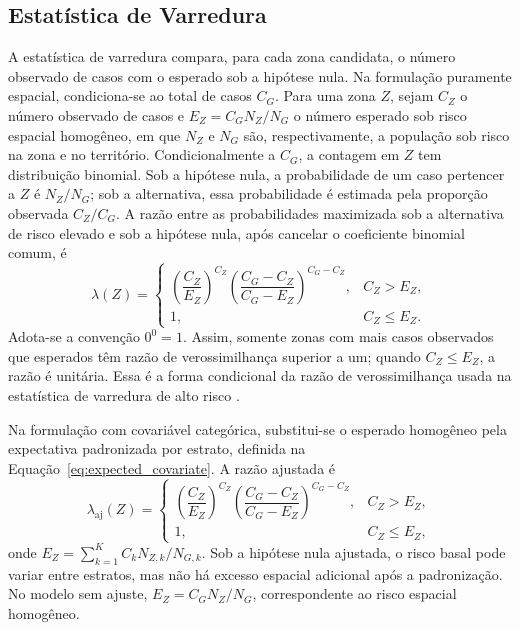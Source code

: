 \subsection{Estatística de Varredura}

A estatística de varredura compara, para cada zona candidata, o número observado de casos com o esperado sob a hipótese nula. Na formulação puramente espacial, condiciona-se ao total de casos \(C_G\). Para uma zona \(Z\), sejam \(C_Z\) o número observado de casos e \(E_Z=C_GN_Z/N_G\) o número esperado sob risco espacial homogêneo, em que \(N_Z\) e \(N_G\) são, respectivamente, a população sob risco na zona e no território. Condicionalmente a \(C_G\), a contagem em \(Z\) tem distribuição binomial. Sob a hipótese nula, a probabilidade de um caso pertencer a \(Z\) é \(N_Z/N_G\); sob a alternativa, essa probabilidade é estimada pela proporção observada \(C_Z/C_G\). A razão entre as probabilidades maximizada sob a alternativa de risco elevado e sob a hipótese nula, após cancelar o coeficiente binomial comum, é
\begin{equation}
\lambda(Z)=
\begin{cases}
\left(\dfrac{C_Z}{E_Z}\right)^{C_Z}
\left(\dfrac{C_G-C_Z}{C_G-E_Z}\right)^{C_G-C_Z}, & C_Z>E_Z,\\[6pt]
1, & C_Z\le E_Z.
\end{cases}
\label{eq:lr_zone}
\end{equation}
Adota-se a convenção \(0^0=1\). Assim, somente zonas com mais casos observados que esperados têm razão de verossimilhança superior a um; quando \(C_Z\le E_Z\), a razão é unitária. Essa é a forma condicional da razão de verossimilhança usada na estatística de varredura de alto risco \cite{kulldorff1997spatial}.

Na formulação com covariável categórica, substitui-se o esperado homogêneo pela expectativa padronizada por estrato, definida na Equação~\eqref{eq:expected_covariate}. A razão ajustada é
\begin{equation}
\lambda_{\mathrm{aj}}(Z)=
\begin{cases}
\left(\dfrac{C_Z}{E_Z}\right)^{C_Z}
\left(\dfrac{C_G-C_Z}{C_G-E_Z}\right)^{C_G-C_Z}, & C_Z>E_Z,\\[6pt]
1, & C_Z\le E_Z,
\end{cases}
\label{eq:lr_covariate}
\end{equation}
onde \(E_Z=\sum_{k=1}^{K} C_kN_{Z,k}/N_{G,k}\). Sob a hipótese nula ajustada, o risco basal pode variar entre estratos, mas não há excesso espacial adicional após a padronização. No modelo sem ajuste, \(E_Z=C_GN_Z/N_G\), correspondente ao risco espacial homogêneo.

